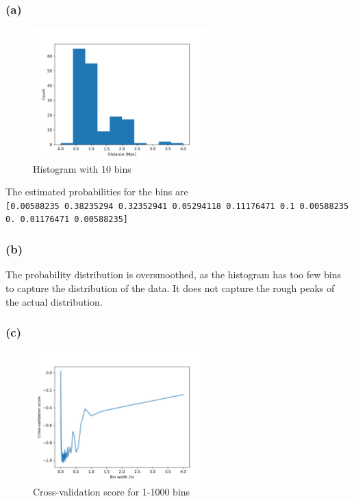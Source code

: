 \subsubsection*{(a)}
\vspace{-30pt}
\begin{figure}[H]
	\centering
	\includegraphics[width=0.6\textwidth]{images/1/10binhistogram.png}
	\caption{Histogram with 10 bins}
\end{figure}
The estimated probabilities for the bins are\\
\texttt{[0.00588235 0.38235294 0.32352941 0.05294118 0.11176471 0.1
			0.00588235 0.         0.01176471 0.00588235]}

\subsubsection*{(b)}
The probability distribution is oversmoothed, as the histogram has too few bins to capture the distribution of the data. It does not capture the rough peaks of the actual distribution.

\subsubsection*{(c)}
\vspace{-30pt}
\begin{figure}[H]
	\centering
	\includegraphics[width=0.6\textwidth]{images/1/crossvalidation.png}
	\caption{Cross-validation score for 1-1000 bins}
\end{figure}

